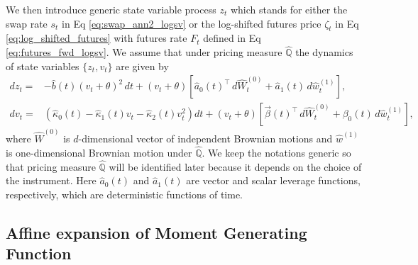 \documentclass[pdftex,11pt,a4paper] {article}
\begin{document}
We then introduce generic state variable process $z_t$ which stands for either the swap rate $s_t$ in Eq \eqref{eq:swap_ann2_logsv} or the log-shifted futures price $\zeta_t$ in Eq \eqref{eq:log_shifted_futures} with futures rate $F_t$ defined in Eq \eqref{eq:futures_fwd_logsv}. We assume that under pricing measure $\mathbb{\hat Q}$ the dynamics of state variables $\{z_t, v_t\}$ are given by
\begin{equation}\label{eq:price_process_logsv}
\begin{split}
dz_t=&-\hat b(t)(v_t+\theta)^2\,dt+(v_t+\theta)\left[\hat a_0(t)^\top\,d\hat W^{(0)}_t+\hat a_1(t)\,d\hat w^{(1)}_t\right],\\
dv_t=&(\hat\kappa_0(t)-\hat\kappa_1(t) v_t-\hat\kappa_2(t)v_t^2)dt+(v_t+\theta)\left[\vec{\beta}(t)^\top \,d\hat W^{(0)}_t+\beta_0(t)\,d\hat w^{(1)}_t\right],
\end{split}
\end{equation}
where $\hat W^{(0)}$ is $d$-dimensional vector of independent Brownian motions and $\hat w^{(1)}$ is one-dimensional Brownian motion under $\mathbb{\hat Q}$. We keep the notations generic so that pricing measure $\mathbb{\hat Q}$ will be identified later because it depends on the choice of the instrument. Here $\hat a_0(t)$ and $\hat a_1(t)$ are vector and scalar leverage functions, respectively, which are deterministic functions of time. 




\subsection{Affine expansion of Moment Generating Function}
\end{document}
